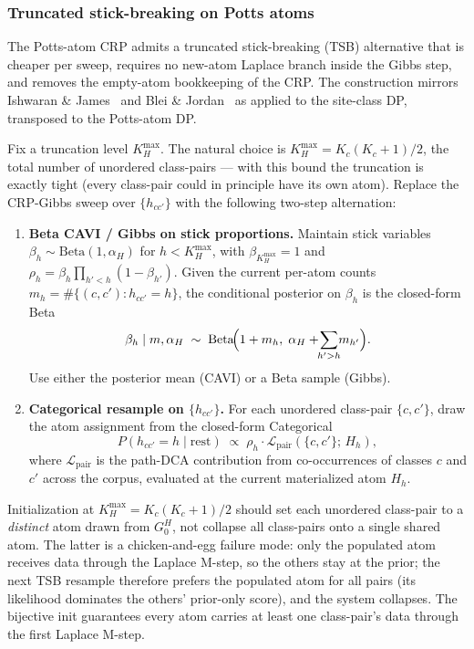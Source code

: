 \subsubsection*{Truncated stick-breaking on Potts atoms}

The Potts-atom CRP admits a truncated stick-breaking (TSB)
alternative that is cheaper per sweep, requires no new-atom Laplace
branch inside the Gibbs step, and removes the empty-atom bookkeeping
of the CRP. The construction mirrors Ishwaran \&
James~\citep{ishwaranjames2001} and Blei \&
Jordan~\citep{bleijordan2006} as applied to the site-class DP,
transposed to the Potts-atom DP.

Fix a truncation level $K_H^{\max}$. The natural choice is
$K_H^{\max} = K_c(K_c + 1)/2$, the total number of unordered
class-pairs --- with this bound the truncation is exactly tight
(every class-pair could in principle have its own atom). Replace
the CRP-Gibbs sweep over $\{h_{cc'}\}$ with the following two-step
alternation:

\begin{enumerate}
\item \textbf{Beta CAVI / Gibbs on stick proportions.} Maintain
  stick variables $\beta_h \sim \mathrm{Beta}(1, \alpha_H)$ for
  $h < K_H^{\max}$, with $\beta_{K_H^{\max}} = 1$ and
  $\rho_h = \beta_h \prod_{h' < h} (1 - \beta_{h'})$. Given the
  current per-atom counts $m_h = \#\{(c, c') : h_{cc'} = h\}$, the
  conditional posterior on $\beta_h$ is the closed-form Beta
\[
    \beta_h \mid m, \alpha_H \;\sim\;
    \mathrm{Beta}\!\Bigl(1 + m_h,\; \alpha_H + \!\!\sum_{h' > h}\!\! m_{h'}\Bigr).
\]
Use either the posterior mean (CAVI) or a Beta sample (Gibbs).

\item \textbf{Categorical resample on $\{h_{cc'}\}$.} For each
  unordered class-pair $\{c, c'\}$, draw the atom assignment from
  the closed-form Categorical
\[
    P(h_{cc'} = h \mid \text{rest}) \;\propto\;
    \rho_h \cdot \mathcal{L}_{\text{pair}}(\{c, c'\};\, H_h),
\]
where $\mathcal{L}_{\text{pair}}$ is the path-DCA contribution from
co-occurrences of classes $c$ and $c'$ across the corpus, evaluated
at the current materialized atom $H_h$.
\end{enumerate}

\begin{remark}
Initialization at $K_H^{\max} = K_c(K_c + 1)/2$ should set each
unordered class-pair to a \emph{distinct} atom drawn from $G_0^H$,
not collapse all class-pairs onto a single shared atom. The latter
is a chicken-and-egg failure mode: only the populated atom receives
data through the Laplace M-step, so the others stay at the prior;
the next TSB resample therefore prefers the populated atom for all
pairs (its likelihood dominates the others' prior-only score), and
the system collapses. The bijective init guarantees every atom
carries at least one class-pair's data through the first Laplace
M-step.
\end{remark}

